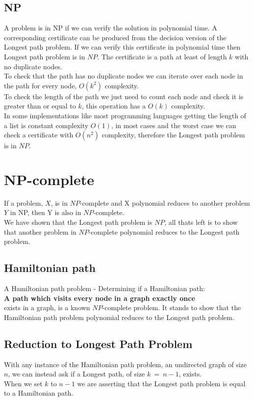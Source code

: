 \documentclass[a4paper,11pt]{article}
\begin{document}
    \subsection{NP}
    A problem is in NP if we can verify the solution in polynomial time. A 
    corresponding certificate can be produced from the decision version of the 
    Longest path problem. If we can verify this certificate in polynomial time 
    then Longest path problem is in $NP$. The certificate is a path at least of 
    length $k$ with no duplicate nodes.\\ 
    To check that the path has no duplicate nodes we can iterate over each node
     in the path for every node, $O(k^2)$ complexity. 
    \\To check the length of the path we just need to count each node
    and check it is greater than or equal to $k$, this operation has a $O(k)$ 
    complexity. 
    \\In some implementations like most programming languages getting the length of 
    a list is constant complexity $O(1)$, in most cases and the worst 
    case we can check a certificate with $O(n^2)$ complexity, therefore the
    Longest path problem is in $NP$.

\section{NP-complete}
If a problem, $X$, is in $NP$-complete and X polynomial reduces to another 
problem $Y$ in NP, then Y is also in $NP$-complete.\\
We have shown that the Longest path problem is $NP$, all thats left is to show 
that another problem in $NP$-complete polynomial reduces to the Longest path 
problem.
\subsection{Hamiltonian path}
A Hamiltonian path problem - Determining if a Hamiltonian path:\\ 
\textbf{A path which visits every node in a graph exactly once}\\ exists in a 
graph, is a known $NP$-complete problem. It stands to show that the Hamiltonian 
path problem polynomial reduces to the Longest path problem.
\subsection{Reduction to Longest Path Problem}
With any instance of the Hamiltonian path problem, an undirected graph of size 
$n$, we can instead ask if a Longest path, of size $k\:=\:n-1$, exists.\\
When we set $k$ to $n-1$ we are asserting that the Longest path
problem is equal to a Hamiltonian path.
\pagebreak
\end{document}
